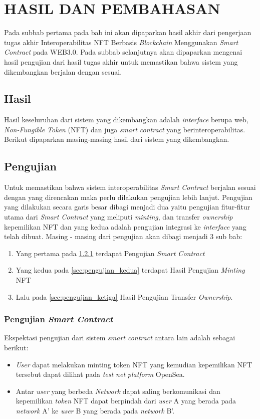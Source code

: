 \chapter{HASIL DAN PEMBAHASAN}
Pada subbab pertama pada bab ini akan dipaparkan hasil akhir dari pengerjaan tugas akhir Interoperabilitas NFT Berbasis \emph{Blockchain} Menggunakan \emph{Smart Contract} pada WEB3.0. Pada subbab selanjutnya akan dipaparkan mengenai hasil pengujian dari hasil tugas akhir untuk memastikan bahwa sistem yang dikembangkan berjalan dengan sesuai.

\section{Hasil}
Hasil keseluruhan dari sistem yang dikembangkan adalah \emph{interface} berupa web, \emph{Non-Fungible Token} (NFT) dan juga \emph{smart contract} yang berinteroperabilitas. Berikut dipaparkan masing-masing hasil dari sistem yang dikembangkan.

\section{Pengujian}
Untuk memastikan bahwa sistem interoperabilitas \emph{Smart Contract} berjalan sesuai dengan yang direncakan maka perlu dilakukan pengujian lebih lanjut. Pengujian yang dilakukan secara garis besar dibagi menjadi dua yaitu pengujian fitur-fitur utama dari \emph{Smart Contract} yang meliputi \emph{minting}, dan transfer \emph{ownership} kepemilikan NFT dan yang kedua adalah pengujian integrasi ke \emph{interface} yang telah dibuat. Masing - masing dari pengujian akan dibagi menjadi 3 sub bab:

\begin{enumerate}[nolistsep]
\item Yang pertama pada \ref*{sec:pengujian_pertama} terdapat Pengujian \emph{Smart Contract}
\item Yang kedua pada \ref*{sec:pengujian_kedua} terdapat Hasil Pengujian \emph{Minting} NFT
\item Lalu pada \ref*{sec:pengujian_ketiga} Hasil Pengujian Transfer \emph{Ownership}.
\end{enumerate} 

\subsection{Pengujian \emph{Smart Contract}}
\label{sec:pengujian_pertama}
Ekspektasi pengujian dari sistem \emph{smart contract} antara lain adalah sebagai berikut:
\begin{itemize}
    \item \emph{User} dapat melakukan minting token NFT yang kemudian kepemilikan NFT tersebut dapat dilihat pada \emph{test net} \emph{platform} OpenSea.

    \item Antar \emph{user} yang berbeda \emph{Network} dapat saling berkomunikasi dan kepemilikan \emph{token} NFT dapat berpindah dari \emph{user} A yang berada pada \emph{network} A' ke \emph{user} B yang berada pada \emph{network} B'.
\end{itemize}


